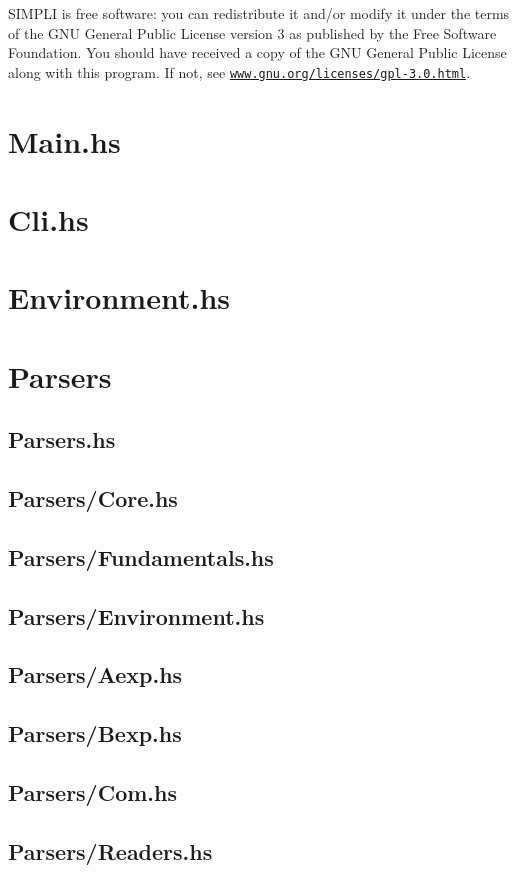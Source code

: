 \documentclass{esposito-documentation}
\begin{document}
SIMPLI is free software: you can redistribute it and/or modify it under the
terms of the GNU General Public License version 3 as published by the Free
Software Foundation. You should have received a copy of the GNU General Public
License along with this program. If not, see
\href{https://www.gnu.org/licenses/gpl-3.0.html}{\texttt{www.gnu.org/licenses/gpl-3.0.html}}.


\section{Main.hs}


\section{Cli.hs}


\section{Environment.hs}


\section{Parsers}
\subsection{Parsers.hs}


\subsection{Parsers/Core.hs}


\subsection{Parsers/Fundamentals.hs}


\subsection{Parsers/Environment.hs}


\subsection{Parsers/Aexp.hs}


\subsection{Parsers/Bexp.hs}


\subsection{Parsers/Com.hs}


\subsection{Parsers/Readers.hs}


\backmatter
\printbibliography
\end{document}
